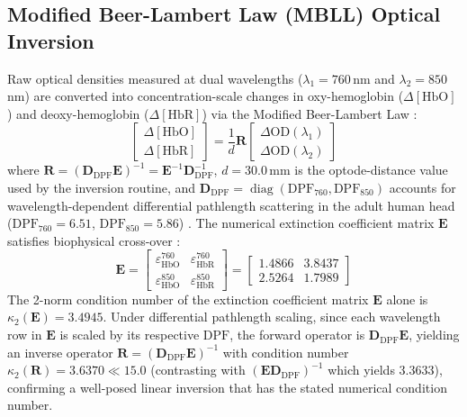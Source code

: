 \documentclass[journal]{IEEEtran}
\begin{document}
\subsection{Modified Beer-Lambert Law (MBLL) Optical Inversion}
Raw optical densities measured at dual wavelengths ($\lambda_1 = 760$\,nm and $\lambda_2 = 850$\,nm) are converted into concentration-scale changes in oxy-hemoglobin ($\Delta[\text{HbO}]$) and deoxy-hemoglobin ($\Delta[\text{HbR}]$) via the Modified Beer-Lambert Law \cite{delpy1988estimation}:
\begin{equation}
\begin{bmatrix}
\Delta[\text{HbO}] \\
\Delta[\text{HbR}]
\end{bmatrix} = \frac{1}{d} \mathbf{R} \begin{bmatrix}
\Delta \text{OD}(\lambda_1) \\
\Delta \text{OD}(\lambda_2)
\end{bmatrix}
\end{equation}
where $\mathbf{R} = (\mathbf{D}_{\mathrm{DPF}} \mathbf{E})^{-1} = \mathbf{E}^{-1} \mathbf{D}_{\mathrm{DPF}}^{-1}$, $d = 30.0$\,mm is the optode-distance value used by the inversion routine, and $\mathbf{D}_{\mathrm{DPF}} = \operatorname{diag}(\text{DPF}_{760}, \text{DPF}_{850})$ accounts for wavelength-dependent differential pathlength scattering in the adult human head ($\text{DPF}_{760} = 6.51$, $\text{DPF}_{850} = 5.86$) \cite{duncan1995measurement, scholkmann2013general}. The numerical extinction coefficient matrix $\mathbf{E}$ satisfies biophysical cross-over \cite{cope1991system}:
\begin{equation}
\mathbf{E} = \begin{bmatrix}
\varepsilon_{\text{HbO}}^{760} & \varepsilon_{\text{HbR}}^{760} \\
\varepsilon_{\text{HbO}}^{850} & \varepsilon_{\text{HbR}}^{850}
\end{bmatrix} = \begin{bmatrix}
1.4866 & 3.8437 \\
2.5264 & 1.7989
\end{bmatrix}
\end{equation}
The 2-norm condition number of the extinction coefficient matrix $\mathbf{E}$ alone is $\kappa_2(\mathbf{E}) = 3.4945$. Under differential pathlength scaling, since each wavelength row in $\mathbf{E}$ is scaled by its respective $\text{DPF}$, the forward operator is $\mathbf{D}_{\mathrm{DPF}}\mathbf{E}$, yielding an inverse operator $\mathbf{R} = (\mathbf{D}_{\mathrm{DPF}} \mathbf{E})^{-1}$ with condition number $\kappa_2(\mathbf{R}) = 3.6370 \ll 15.0$ (contrasting with $(\mathbf{E}\mathbf{D}_{\mathrm{DPF}})^{-1}$ which yields $3.3633$), confirming a well-posed linear inversion that has the stated numerical condition number.
\end{document}
